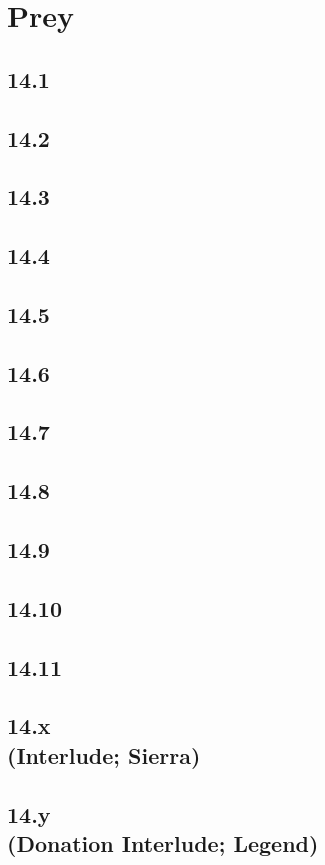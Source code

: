 \part{Prey}
 \chapter{14.1}
 \chapter{14.2}
 \chapter{14.3}
 \chapter{14.4}
 \chapter{14.5}
 \chapter{14.6}
 \chapter{14.7}
 \chapter{14.8}
 \chapter{14.9}
 \chapter{14.10}
 \chapter{14.11}
 \chapter[14.x (Interlude; Sierra)]{14.x\\(Interlude; Sierra)}
 \chapter[14.y (Donation Interlude; Legend)]{14.y\\(Donation Interlude; Legend)}














